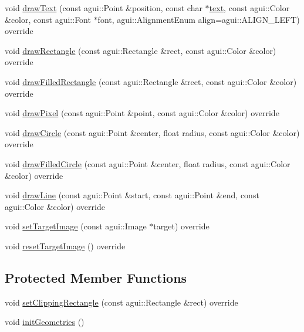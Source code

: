 \begin{DoxyCompactItemize}
void \mbox{\hyperlink{classec_1_1_open_g_l_graphics_ae3901503a573bd38db1a13d9ceca4054}{draw\+Text}} (const agui\+::\+Point \&position, const char $\ast$\mbox{\hyperlink{namespaceec_a0bdee24285d69deca899e166b29c0150}{text}}, const agui\+::\+Color \&color, const agui\+::\+Font $\ast$font, agui\+::\+Alignment\+Enum align=agui\+::\+A\+L\+I\+G\+N\+\_\+\+L\+E\+FT) override
\item 
void \mbox{\hyperlink{classec_1_1_open_g_l_graphics_a9aca169aa522b2daca935407d865c84f}{draw\+Rectangle}} (const agui\+::\+Rectangle \&rect, const agui\+::\+Color \&color) override
\item 
void \mbox{\hyperlink{classec_1_1_open_g_l_graphics_abfd38f4ba4c8d04ed80c62c06895ef98}{draw\+Filled\+Rectangle}} (const agui\+::\+Rectangle \&rect, const agui\+::\+Color \&color) override
\item 
void \mbox{\hyperlink{classec_1_1_open_g_l_graphics_a3f747db5664a109b28c66de6e092fbcf}{draw\+Pixel}} (const agui\+::\+Point \&point, const agui\+::\+Color \&color) override
\item 
void \mbox{\hyperlink{classec_1_1_open_g_l_graphics_aeccf106f9e5f5da14db66d39595fc6e9}{draw\+Circle}} (const agui\+::\+Point \&center, float radius, const agui\+::\+Color \&color) override
\item 
void \mbox{\hyperlink{classec_1_1_open_g_l_graphics_aec55bf7ce016cf9eb3f2a01adaafefa4}{draw\+Filled\+Circle}} (const agui\+::\+Point \&center, float radius, const agui\+::\+Color \&color) override
\item 
void \mbox{\hyperlink{classec_1_1_open_g_l_graphics_a174cd34243e20b2639ece416b4df3a6b}{draw\+Line}} (const agui\+::\+Point \&start, const agui\+::\+Point \&end, const agui\+::\+Color \&color) override
\item 
void \mbox{\hyperlink{classec_1_1_open_g_l_graphics_a2fd15c1fa0a4e87faa64273fd4407c1d}{set\+Target\+Image}} (const agui\+::\+Image $\ast$target) override
\item 
void \mbox{\hyperlink{classec_1_1_open_g_l_graphics_a16be712e57304e998ad6756c0ef17124}{reset\+Target\+Image}} () override
\end{DoxyCompactItemize}
\subsection*{Protected Member Functions}
\begin{DoxyCompactItemize}
\item 
void \mbox{\hyperlink{classec_1_1_open_g_l_graphics_a6e0b9ec8acb248e34560e0694b413b90}{set\+Clipping\+Rectangle}} (const agui\+::\+Rectangle \&rect) override
\item 
void \mbox{\hyperlink{classec_1_1_open_g_l_graphics_ae6eeb83c6f80766df74bb1e98803cb41}{init\+Geometries}} ()
\end{DoxyCompactItemize}
